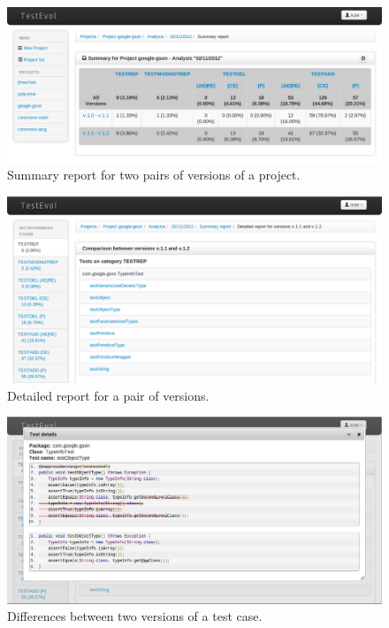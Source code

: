 \documentclass[conference]{IEEEtran}
\begin{document}
\begin{figure}[t]
	\centering
	\includegraphics[width=\columnwidth]{1-summary}
        \vspace*{-20pt}
	\caption{Summary report for two pairs of versions of a
          project.}
        \vspace*{-8pt}
	\label{fig:summary}
\end{figure}

\begin{figure}[t]
	\centering
	\includegraphics[width=\columnwidth]{2-versiondetails}
        \vspace*{-20pt}
	\caption{Detailed report for a pair of versions.}
        \vspace*{-8pt}
	\label{fig:versiondetails}
\end{figure}

\begin{figure}[t]
	\centering
	\includegraphics[width=\columnwidth]{3-testdetails}
        \vspace*{-20pt}
	\caption{Differences between two versions of a test case.}
        \vspace*{-8pt}
	\label{fig:testdetails}
\end{figure}
\end{document}
